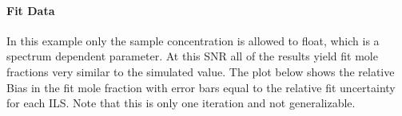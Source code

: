 \documentclass[letterpaper,10pt,english]{sphinxmanual}
\begin{document}
\begin{sphinxVerbatim}[commandchars=\\\{\}]
                 
                                                                                                                                                                           
  
                                                                                                                                                                              
\end{sphinxVerbatim}


\paragraph{Fit Data}
\label{\detokenize{Including instrument line shapes in simulation and fits:fit-data}}
\sphinxAtStartPar
In this example only the sample concentration is allowed to float, which is a spectrum dependent parameter.  At this SNR all of the results yield fit mole fractions very similar to the simulated value.  The plot below shows the relative Bias in the fit mole fraction with error bars equal to the relative fit uncertainty for each ILS.  Note that this is only one iteration and not generalizable.
\end{document}
